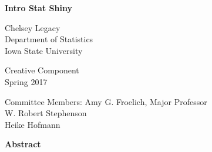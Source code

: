 \documentclass[11pt]{book}
\begin{document}
\begin{titlepage}
    \begin{center}
                
        \Large
        \textbf{Intro Stat Shiny}
        
      
        \vspace{1cm}
       
        
        \Large
        Chelsey Legacy \\
        \vspace{0.25cm}
        Department of Statistics\\
          \vspace{0.25cm}
        Iowa State University\\
       
        
        \vspace{1cm}
               
           Creative Component\\
             \vspace{0.25cm}
           Spring 2017
           
           \vspace{2cm}
           
           Committee Members: Amy G. Froelich, Major Professor \\
              \vspace{0.25cm}
           \hspace{2.4cm} W. Robert Stephenson \\
              \vspace{0.25cm}
          \hspace{1cm} Heike Hofmann  
               
        
        
    \end{center}
\end{titlepage}







\begin{center}
\textbf{Abstract}
\end{center}
\newpage
\tableofcontents
\renewcommand\thechapter{\arabic{chapter}}
\renewcommand\thesection{\arabic{section}}

\newpage
\end{document}
